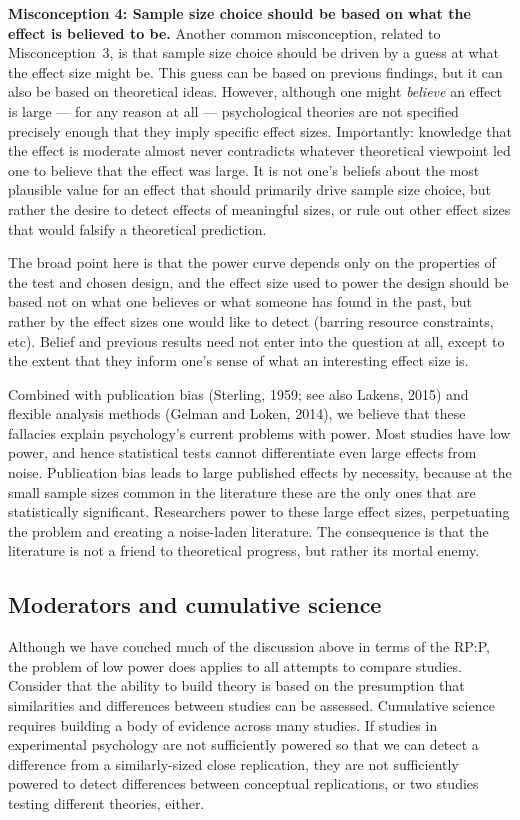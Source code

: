 \documentclass[doc,a4paper,floatsintext,draftfirst]{apa6}
\begin{document}
{\bf Misconception 4: Sample size choice should be based on what the effect is believed to be.}
Another common misconception, related to Misconception~3, is that sample size choice should be driven by a guess at what the effect size might be. This guess can be based on previous findings, but it can also be based on theoretical ideas. However, although one might {\em believe} an effect is large --- for any reason at all --- psychological theories are not specified precisely enough that they imply specific effect sizes. Importantly: knowledge that the effect is moderate almost never contradicts whatever theoretical viewpoint led one to believe that the effect was large. It is not one's beliefs about the most plausible value for an effect that should primarily drive sample size choice, but rather the desire to detect effects of meaningful sizes, or rule out other effect sizes that would falsify a theoretical prediction. 

The broad point here is that the power curve depends only on the properties of the test and chosen design, and the effect size used to power the design should be based not on what one believes or what someone has found in the past, but rather by the effect sizes one would like to detect (barring resource constraints, etc). Belief and previous results need not enter into the question at all, except to the extent that they inform one's sense of what an interesting effect size is.

Combined with publication bias (Sterling, 1959; see also Lakens, 2015) and flexible analysis methods (Gelman and Loken, 2014), we believe that these fallacies explain psychology's current problems with power. Most studies have low power, and hence statistical tests cannot differentiate even large effects from noise. Publication bias leads to large published effects by necessity, because at the small sample sizes common in the literature these are the only ones that are statistically significant. Researchers power to these large effect sizes, perpetuating the problem and creating a noise-laden literature. The consequence is that the literature is not a friend to theoretical progress, but rather its mortal enemy. 

\nocite{Sterling:1959,Gelman:Loken:2014,Lakens:2015}

\subsection{Moderators and cumulative science}
Although we have couched much of the discussion above in terms of the RP:P, the problem of low power does applies to all attempts to compare studies. Consider that the ability to build theory is based on the presumption that similarities and differences between studies can be assessed. Cumulative science requires building a body of evidence across many studies. If studies in experimental psychology are not sufficiently powered so that we can detect a difference from a similarly-sized close replication, they are not sufficiently powered to detect differences between conceptual replications, or two studies testing different theories, either. 
\end{document}
